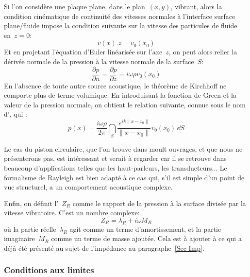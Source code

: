 \medskip
Si l'on considère une plaque plane, dans le plan~$(x,y)$, vibrant, alors la condition cinématique de continuité des vitesses normales à l'interface surface plane/fluide impose la condition suivante sur la vitesse des particules de fluide en~$z= 0$:
\[ v(x).z = v_0(x_0) \]
Et en projetant l'équation d'Euler linéarisée sur l'axe~$z$, on peut alors relier la dérivée normale de la pression à la vitesse normale de la surface~$S$:
\begin{equation}
\dfrac{\partial p}{\partial n} = \dfrac{\partial p}{\partial z} = i\omega\rho v_0(x_0)
\end{equation}
En l'absence de toute autre source acoustique, le théorème de Kirchhoff ne comporte plus de terme volumique. En introduisant la fonction de Green et la valeur de la pression normale, on obtient le relation suivante, connue sous le nom d', qui :
\begin{equation}
p(x)=\dfrac{i\omega\rho}{2\pi}\dint_S  \dfrac{e^{ik\|x-x_0\|}}{\|x-x_0\|} v_0(x_0)\,\dd S
\end{equation}

\begin{remarque}
Le cas du piston circulaire, que l'on trouve dans moult ouvrages, et que nous ne présenterons pas, est intéressant et serait à regarder car il se retrouve dans beaucoup d'applications telles que les haut-parleurs, les transducteurs... Le formalisme de Rayleigh est bien adapté à ce cas qui, s'il est simple d'un point de vue structurel, a un comportement acoustique complexe.
\end{remarque}

Enfin, on définit l'~$Z_R$ comme le rapport de la pression à la surface divisée par la vitesse vibratoire. C'est un nombre complexe:
\begin{equation}
Z_R = \lambda_R + i\omega M_R
\end{equation}
où la partie réelle~$\lambda_R$ agit comme un terme d'amortissement, et la partie imaginaire~$M_R$ comme un terme de masse ajoutée. Cela est à ajouter à ce qui a déjà été présenté au sujet de l'impédance au paragraphe~\ref{Sec-Imp}.


\medskip
\subsubsection{Conditions aux limites}

